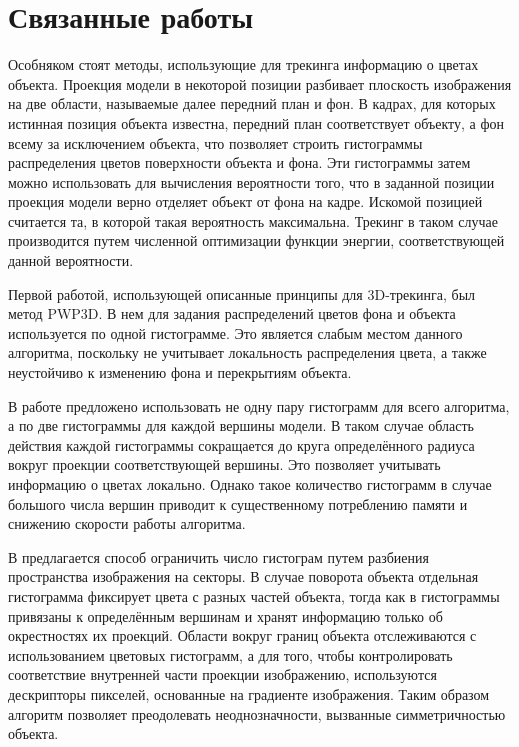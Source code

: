 \section{Связанные работы}


Особняком стоят методы, использующие для трекинга информацию о цветах объекта.
Проекция модели в некоторой позиции разбивает плоскость изображения на две
области, называемые далее передний план и фон.
В кадрах, для которых истинная позиция объекта известна, передний план
соответствует объекту, а фон всему за исключением объекта, что позволяет
строить гистограммы распределения цветов поверхности объекта и фона.
Эти гистограммы затем можно использовать для вычисления вероятности того, что в
заданной позиции проекция модели верно отделяет объект от фона на кадре.
Искомой позицией считается та, в которой такая вероятность максимальна.
Трекинг в таком случае производится путем численной оптимизации функции
энергии, соответствующей данной вероятности.

Первой работой, использующей описанные принципы для 3D-трекинга,
был метод PWP3D\cite{PWP3D}.
В нем для задания распределений цветов фона и объекта используется по одной
гистограмме.
Это является слабым местом данного алгоритма, поскольку не учитывает
локальность распределения цвета, а также неустойчиво к изменению фона
и перекрытиям объекта.

В работе \cite{Tjaden2017} предложено использовать не одну пару гистограмм для
всего алгоритма, а по две гистограммы для каждой вершины модели.
В таком случае область действия каждой гистограммы сокращается до круга
определённого радиуса вокруг проекции соответствующей вершины.
Это позволяет учитывать информацию о цветах локально.
Однако такое количество гистограмм в случае большого числа вершин приводит к
существенному потреблению памяти и снижению скорости работы алгоритма.

В \cite{RegionPhotometric} предлагается способ ограничить число гистограм
путем разбиения пространства изображения на секторы.
В случае поворота объекта отдельная гистограмма фиксирует цвета с разных частей
объекта, тогда как в \cite{Tjaden2017} гистограммы привязаны к определённым
вершинам и хранят информацию только об окрестностях их проекций.
Области вокруг границ объекта отслеживаются с использованием цветовых
гистограмм, а для того, чтобы контролировать соответствие внутренней части
проекции изображению, используются дескрипторы пикселей, основанные на
градиенте изображения.
Таким образом алгоритм позволяет преодолевать неоднозначности, вызванные
симметричностью объекта.
